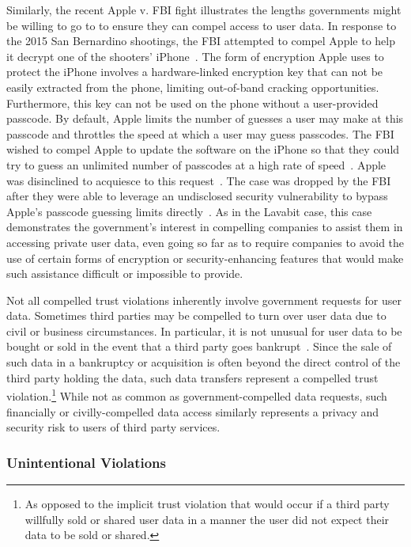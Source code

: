 Similarly, the recent Apple v. FBI fight illustrates the lengths
governments might be willing to go to to ensure they can compel access
to user data.  In response to the 2015 San Bernardino shootings, the
FBI attempted to compel Apple to help it decrypt one of the shooters'
iPhone~\cite{ars-cookvfbi}. The form of encryption Apple uses to
protect the iPhone involves a hardware-linked encryption key that can
not be easily extracted from the phone, limiting out-of-band cracking
opportunities. Furthermore, this key can not be used on the phone
without a user-provided passcode. By default, Apple limits the number
of guesses a user may make at this passcode and throttles the speed at
which a user may guess passcodes. The FBI wished to compel Apple to
update the software on the iPhone so that they could try to guess an
unlimited number of passcodes at a high rate of
speed~\cite{eff-applecrypto}. Apple was disinclined to acquiesce to
this request~\cite{apple-fbiletter}. The case was dropped by the FBI
after they were able to leverage an undisclosed security vulnerability
to bypass Apple's passcode guessing limits
directly~\cite{ars-fbi-breakthrough, ars-fbi-greyhats}. As in the
Lavabit case, this case demonstrates the government's interest in
compelling companies to assist them in accessing private user data,
even going so far as to require companies to avoid the use of certain
forms of encryption or security-enhancing features that would make
such assistance difficult or impossible to provide.

Not all compelled trust violations inherently involve government
requests for user data. Sometimes third parties may be compelled to
turn over user data due to civil or business circumstances. In
particular, it is not unusual for user data to be bought or sold in
the event that a third party goes bankrupt~\cite{nguyen2004,
  singer2015, solove2015}. Since the sale of such data in a bankruptcy
or acquisition is often beyond the direct control of the third party
holding the data, such data transfers represent a compelled trust
violation.\footnote{As opposed to the implicit trust violation that
  would occur if a third party willfully sold or shared user data in a
  manner the user did not expect their data to be sold or shared.}
While not as common as government-compelled data requests, such
financially or civilly-compelled data access similarly represents a
privacy and security risk to users of third party services.

\subsubsection{Unintentional Violations}

